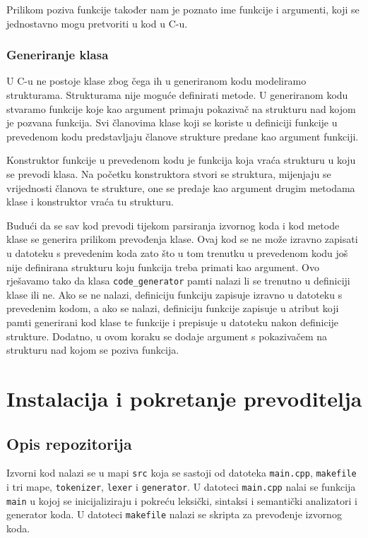 \documentclass[times, utf8, zavrsni]{fer}
\begin{document}
Prilikom poziva funkcije također nam je poznato ime funkcije i argumenti, koji se jednostavno mogu
pretvoriti u kod u C-u.

\subsection{Generiranje klasa}
U C-u ne postoje klase zbog čega ih u generiranom kodu modeliramo strukturama.
Strukturama nije moguće definirati metode. U generiranom kodu stvaramo funkcije
koje kao argument primaju pokazivač na strukturu nad kojom je pozvana funkcija.
Svi članovima klase koji se koriste u definiciji funkcije u prevedenom kodu predstavljaju
članove strukture predane kao argument funkciji. 

Konstruktor funkcije u prevedenom kodu je funkcija koja vraća strukturu u koju se prevodi klasa. Na početku konstruktora stvori
se struktura, mijenjaju se vrijednosti članova te strukture, one se predaje kao argument drugim metodama klase i konstruktor
vraća tu strukturu.

Budući da se sav kod prevodi tijekom parsiranja izvornog koda i kod metode klase
se generira prilikom prevođenja klase. Ovaj kod se ne može izravno zapisati u datoteku s prevedenim koda zato što u
tom trenutku u prevedenom kodu još nije definirana strukturu koju funkcija treba primati kao argument. Ovo rješavamo tako da
klasa \verb|code_generator| pamti nalazi li se trenutno u definiciji klase ili ne. Ako se ne nalazi, definiciju funkciju zapisuje izravno
u datoteku s prevedenim kodom, a ako se nalazi, definiciju funkcije zapisuje u atribut koji pamti generirani kod klase te funkcije i prepisuje u datoteku nakon
definicije strukture. Dodatno, u ovom koraku se dodaje argument s pokazivačem na strukturu nad kojom se poziva funkcija.

\chapter{Instalacija i pokretanje prevoditelja}
\section{Opis repozitorija}
Izvorni kod nalazi se u mapi \verb|src| koja se sastoji od datoteka \verb|main.cpp|, \verb|makefile| i tri mape, \verb|tokenizer|, \verb|lexer| i \verb|generator|.
U datoteci \verb|main.cpp| nalai se funkcija \verb|main| u kojoj se inicijaliziraju i pokreću leksički, sintaksi i semantički analizatori i generator koda.
U datoteci \verb|makefile| nalazi se skripta za prevođenje izvornog koda.
\end{document}
